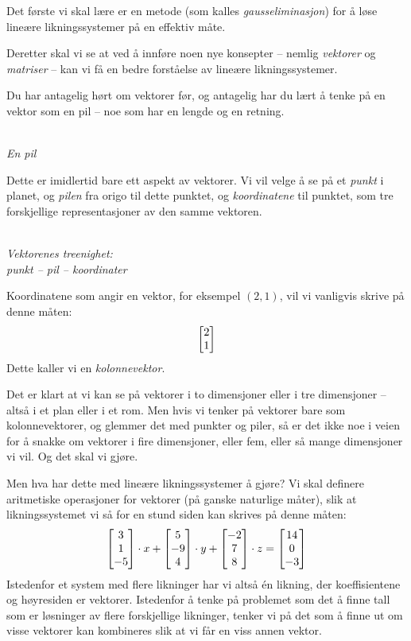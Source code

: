 \smallskip
Det første vi skal lære er en metode (som kalles
\emph{gausseliminasjon}) for å løse lineære likningssystemer på en
effektiv måte.

Deretter skal vi se at ved å innføre noen nye konsepter -- nemlig
\emph{vektorer} og \emph{matriser} -- kan vi få en bedre forståelse av
lineære likningssystemer.

Du har antagelig hørt om vektorer før, og antagelig har du lært å
tenke på en vektor som en pil -- noe som har en lengde og en retning.
\begin{center}
\\
{\small \textit{En pil}}
\end{center}
Dette er imidlertid bare ett aspekt av vektorer.  Vi vil velge å se på
et \emph{punkt} i planet, og \emph{pilen} fra origo til dette punktet, og
\emph{koordinatene} til punktet, som tre forskjellige representasjoner
av den samme vektoren.
\begin{center}
\\
{\small \textit{Vektorenes treenighet:\\punkt -- pil -- koordinater}}
\end{center}
Koordinatene som angir en vektor, for eksempel $(2,1)$, vil vi
vanligvis skrive på denne måten:
\[
\begin{bmatrix} 2 \\ 1 \end{bmatrix}
\]
Dette kaller vi en \emph{kolonnevektor}.

Det er klart at vi kan se på vektorer i to dimensjoner eller i tre
dimensjoner -- altså i et plan eller i et rom.  Men hvis vi tenker på
vektorer bare som kolonnevektorer, og glemmer det med punkter og
piler, så er det ikke noe i veien for å snakke om vektorer i fire
dimensjoner, eller fem, eller så mange dimensjoner vi vil.  Og det
skal vi gjøre.

Men hva har dette med lineære likningssystemer å gjøre?  Vi skal
definere aritmetiske operasjoner for vektorer (på ganske naturlige
måter), slik at likningssystemet vi så for en stund siden kan skrives
på denne måten:
\[
\begin{bmatrix} 3 \\ 1 \\ -5 \end{bmatrix} \cdot x + \begin{bmatrix} 5 \\ -9 \\ 4 \end{bmatrix} \cdot y + \begin{bmatrix} -2 \\ 7 \\ 8 \end{bmatrix} \cdot z = \begin{bmatrix} 14 \\ 0 \\ -3 \end{bmatrix}
\]
Istedenfor et system med flere likninger har vi altså én likning, der
koeffisientene og høyresiden er vektorer.  Istedenfor å tenke på
problemet som det å finne tall som er løsninger av flere forskjellige
likninger, tenker vi på det som å finne ut om visse vektorer kan
kombineres slik at vi får en viss annen vektor.

